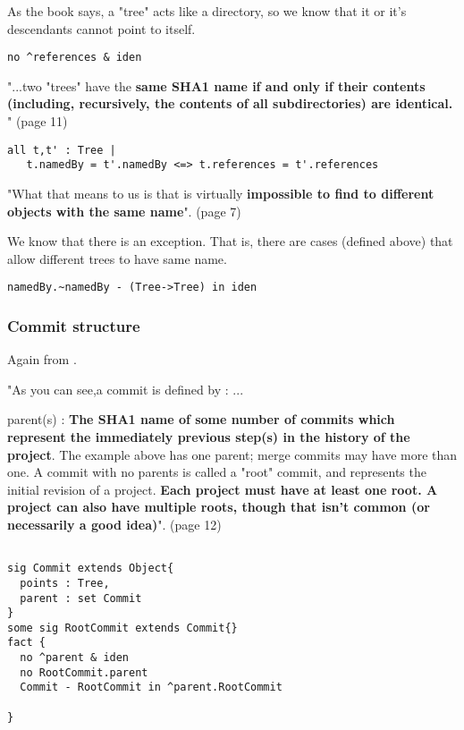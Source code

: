 As the book \cite{gitComm} says, a "tree" acts
like a directory, so we know that it or it's 
descendants cannot point to itself.
\begin{lstlisting}
no ^references & iden 
\end{lstlisting}

"...two "trees" have the { \bf same SHA1 name if and only if their
contents (including, recursively, the contents of all subdirectories)
are identical.} " (page 11)

\begin{lstlisting}
all t,t' : Tree | 
   t.namedBy = t'.namedBy <=> t.references = t'.references
\end{lstlisting}

"What that means to us is that is virtually {\bf impossible to find to 
different objects with the same name}". (page 7) \par
We know that there is an exception. That is,
there are cases (defined above)
that allow different trees to have same name. 

\begin{lstlisting}
namedBy.~namedBy - (Tree->Tree) in iden
\end{lstlisting}


\subsubsection{Commit structure}

Again from \cite{gitComm}. \par 
"As you can see,a commit is defined by :
... \par
parent(s) : {\bf The SHA1 name of some number of commits which
represent the immediately previous step(s) in the 
history of the project}. The example above has one parent;
merge commits may have more than one. A commit with no 
parents is called a "root" commit, and represents the 
initial revision of a project. {\bf Each project must have at
least one root. A project can also have multiple roots,
though that isn't common (or necessarily a good idea)}". (page 12)

\begin{lstlisting}

sig Commit extends Object{
  points : Tree,
  parent : set Commit
}
some sig RootCommit extends Commit{}
fact {
  no ^parent & iden
  no RootCommit.parent
  Commit - RootCommit in ^parent.RootCommit

}

\end{lstlisting}


